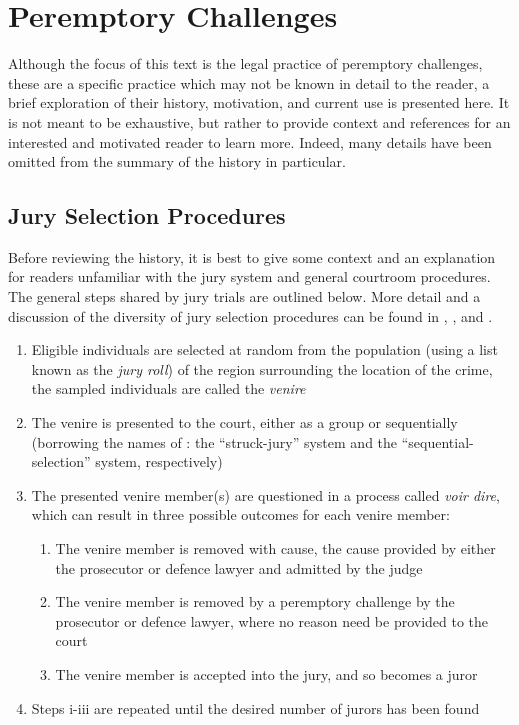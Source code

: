 \chapter{Peremptory Challenges} \label{c:background}

Although the focus of this text is the legal practice of peremptory challenges, these are a specific practice which may not be
known in detail to the reader, a brief exploration of their history, motivation, and current use is presented here. It is not
meant to be exhaustive, but rather to provide context and references for an interested and motivated reader to learn more. Indeed,
many details have been omitted from the summary of the history in particular.

\section{Jury Selection Procedures} \label{sec:jurysel}

Before reviewing the history, it is best to give some context and an explanation for readers unfamiliar with the jury system and
general courtroom procedures. The general steps shared by jury trials are outlined below. More detail and a discussion of the
diversity of jury selection procedures can be found in \cite{ford2010}, \cite{hansvidjudging}, and \cite{vandykejurysel}.

\begin{enumerate}
  \item Eligible individuals are selected at random from the population (using a list known as the \textit{jury roll}) of the
    region surrounding the location of the crime, the sampled individuals are called the \textit{venire}
  \item The venire is presented to the court, either as a group or sequentially (borrowing the names of \cite{ford2010}: the
    ``struck-jury'' system and the ``sequential-selection'' system, respectively)
  \item The presented venire member(s) are questioned in a process called \textit{voir dire}, which can result in three possible
    outcomes for each venire member:
    \begin{enumerate}
      \item The venire member is removed with cause, the cause provided by either the prosecutor or defence lawyer and admitted by
        the judge
      \item The venire member is removed by a peremptory challenge by the prosecutor or defence lawyer, where no reason need be
        provided to the court
      \item The venire member is accepted into the jury, and so becomes a juror
    \end{enumerate}
  \item Steps i-iii are repeated until the desired number of jurors has been found
\end{enumerate}

